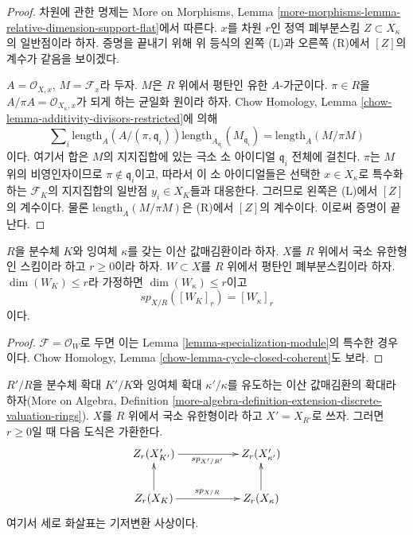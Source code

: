 \begin{proof}
차원에 관한 명제는 More on Morphisms, Lemma
\ref{more-morphisms-lemma-relative-dimension-support-flat}에서 따른다.
$x$를 차원 $r$인 정역 폐부분스킴 $Z \subset X_\kappa$의
일반점이라 하자. 증명을 끝내기 위해 위 등식의 왼쪽 (L)과
오른쪽 (R)에서 $[Z]$의 계수가 같음을 보이겠다.

\medskip\noindent
$A = \mathcal{O}_{X, x}$, $M = \mathcal{F}_x$라 두자.
$M$은 $R$ 위에서 평탄인 유한 $A$-가군이다. $\pi \in R$을
$A/\pi A = \mathcal{O}_{X_\kappa, x}$가 되게 하는 균일화 원이라 하자.
Chow Homology, Lemma \ref{chow-lemma-additivity-divisors-restricted}에 의해
$$
\sum\nolimits_i \text{length}_A(A/(\pi, \mathfrak q_i))
\text{length}_{A_{\mathfrak q_i}}(M_{\mathfrak q_i}) =
\text{length}_A(M/\pi M)
$$
이다. 여기서 합은 $M$의 지지집합에 있는 극소 소 아이디얼
$\mathfrak q_i$ 전체에 걸친다. $\pi$는 $M$ 위의 비영인자이므로
$\pi \not \in \mathfrak q_i$이고, 따라서 이 소 아이디얼들은 선택한
$x \in X_\kappa$로 특수화하는 $\mathcal{F}_K$의 지지집합의 일반점
$y_i \in X_K$들과 대응한다. 그러므로 왼쪽은 (L)에서 $[Z]$의
계수이다. 물론 $\text{length}_A(M/\pi M)$은 (R)에서 $[Z]$의
계수이다. 이로써 증명이 끝난다.
\end{proof}

\begin{lemma}
\label{lemma-specialization-closed}
$R$을 분수체 $K$와 잉여체 $\kappa$를 갖는 이산 값매김환이라 하자.
$X$를 $R$ 위에서 국소 유한형인 스킴이라 하고 $r \geq 0$이라 하자.
$W \subset X$를 $R$ 위에서 평탄인 폐부분스킴이라 하자.
$\dim(W_K) \leq r$라 가정하면 $\dim(W_\kappa) \leq r$이고
$$
sp_{X/R}([W_K]_r) = [W_\kappa]_r
$$
이다.
\end{lemma}

\begin{proof}
$\mathcal{F} = \mathcal{O}_W$로 두면 이는
Lemma \ref{lemma-specialization-module}의 특수한 경우이다.
Chow Homology, Lemma \ref{chow-lemma-cycle-closed-coherent}도 보라.
\end{proof}

\begin{lemma}
\label{lemma-specialization-extension}
$R'/R$을 분수체 확대 $K'/K$와 잉여체 확대 $\kappa'/\kappa$를
유도하는 이산 값매김환의 확대라 하자(More on Algebra, Definition
\ref{more-algebra-definition-extension-discrete-valuation-rings}).
$X$를 $R$ 위에서 국소 유한형이라 하고 $X' = X_{R'}$로 쓰자.
그러면 $r \geq 0$일 때 다음 도식은 가환한다.
$$
\xymatrix{
Z_r(X'_{K'}) \ar[rr]_{sp_{X'/R'}} & & Z_r(X'_{\kappa'}) \\
Z_r(X_K) \ar[rr]^{sp_{X/R}} \ar[u] & & Z_r(X_\kappa) \ar[u]
}
$$
여기서 세로 화살표는 기저변환 사상이다.
\end{lemma}

